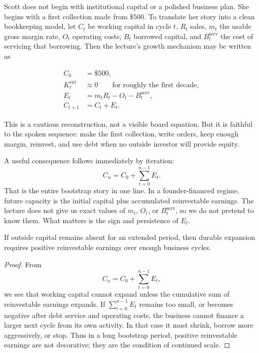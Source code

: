 Scott does not begin with institutional capital or a polished business plan. She begins with a first collection made from \(\$500\). To translate her story into a clean bookkeeping model, let \(C_t\) be working capital in cycle \(t\), \(R_t\) sales, \(m_t\) the usable gross margin rate, \(O_t\) operating costs, \(B_t\) borrowed capital, and \(B_t^{\text{serv}}\) the cost of servicing that borrowing. Then the lecture's growth mechanism may be written as

\begin{align}
C_0 &= \$500,\\
K_t^{\text{ext}} &\approx 0 \qquad \text{for roughly the first decade},\\
E_t &= m_t R_t - O_t - B_t^{\text{serv}},\\
C_{t+1} &= C_t + E_t.
\end{align}

This is a cautious reconstruction, not a visible board equation. But it is faithful to the spoken sequence: make the first collection, write orders, keep enough margin, reinvest, and use debt when no outside investor will provide equity.

A useful consequence follows immediately by iteration:
\begin{equation}
C_n = C_0 + \sum_{t=0}^{n-1} E_t.
\end{equation}
That is the entire bootstrap story in one line. In a founder-financed regime, future capacity is the initial capital plus accumulated reinvestable earnings. The lecture does not give us exact values of \(m_t\), \(O_t\), or \(B_t^{\text{serv}}\), so we do not pretend to know them. What matters is the sign and persistence of \(E_t\).

\begin{proposition}
If outside capital remains absent for an extended period, then durable expansion requires positive reinvestable earnings over enough business cycles.
\end{proposition}

\begin{proof}
From
\[
C_n = C_0 + \sum_{t=0}^{n-1} E_t,
\]
we see that working capital cannot expand unless the cumulative sum of reinvestable earnings expands. If \(\sum_{t=0}^{n-1} E_t\) remains too small, or becomes negative after debt service and operating costs, the business cannot finance a larger next cycle from its own activity. In that case it must shrink, borrow more aggressively, or stop. Thus in a long bootstrap period, positive reinvestable earnings are not decorative; they are the condition of continued scale.
\end{proof}

